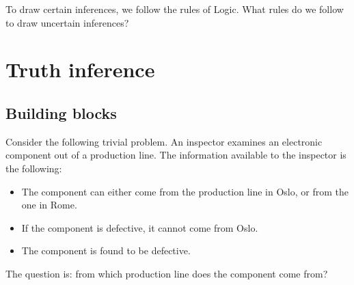 \documentclass[
  a4paper,
  DIV=11,
  numbers=noendperiod,
  oneside]{scrreprt}
\begin{document}
To draw certain inferences, we follow the rules of Logic. What rules do
we follow to draw uncertain inferences?


\hypertarget{sec-truth-inference}{%
\chapter{Truth inference}\label{sec-truth-inference}}

\providecommand{\ul}{\uline}
\renewcommand*{\|}[1][]{\nonscript\:#1\vert\nonscript\:\mathopen{}}
\providecommand*{\pr}[1]{\textsf{\small`#1'}}
\renewcommand*{\pr}[1]{\textsf{\small`#1'}}
\providecommand*{\prq}[1]{\textsf{\small #1}}
\renewcommand*{\prq}[1]{\textsf{\small #1}}
\providecommand{\se}[1]{\mathsfit{#1}}
\renewcommand{\se}[1]{\mathsfit{#1}}
\providecommand{\p}{\mathrm{p}}
\renewcommand{\p}{\mathrm{p}}
\renewcommand{\P}{\mathrm{P}}

\hypertarget{building-blocks}{%
\section{Building blocks}\label{building-blocks}}

Consider the following trivial problem. An inspector examines an
electronic component out of a production line. The information available
to the inspector is the following:

\begin{itemize}
\item
  The component can either come from the production line in Oslo, or
  from the one in Rome.
\item
  If the component is defective, it cannot come from Oslo.
\item
  The component is found to be defective.
\end{itemize}

The question is: from which production line does the component come
from?
\end{document}
